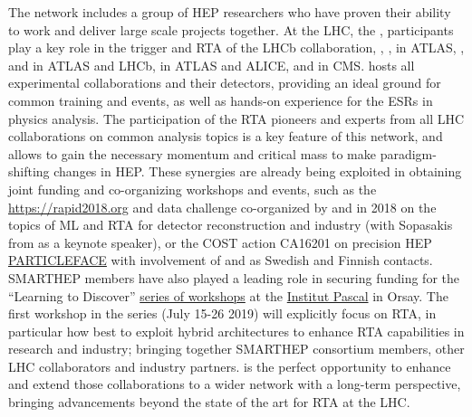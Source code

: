 The \acronym network includes a group of HEP researchers who have proven their ability to work and deliver large scale projects together. 
At the LHC, the \dortmundentity, \santiagoentity participants play a key role in the trigger and RTA of the LHCb collaboration, \ohioentity, \pisaentity, \oregonentity in ATLAS, \cnrsentity, \nikhef and \heidelbergentity in ATLAS and LHCb, \lundentity in ATLAS and ALICE, \helsinkientity and \cernentity in CMS.
\cernentity hosts all experimental collaborations and their detectors, providing an ideal ground for common training and events, as well as hands-on experience for the ESRs in physics analysis. 
The participation of the RTA pioneers and experts from all LHC collaborations on common analysis topics is a key feature of this network, and allows to gain the necessary momentum and critical mass to make paradigm-shifting changes in HEP. 
These synergies are already being exploited in obtaining joint funding and co-organizing workshops and events, such as the \href{RAPID workshop}{https://rapid2018.org} and data challenge co-organized by \dortmundentity and \cnrsentity in 2018 on the topics of ML and RTA for detector reconstruction and industry (with Sopasakis from \ximantisentity as a keynote speaker), or the COST action CA16201 on precision HEP \href{https://particleface.eu}{PARTICLEFACE} with involvement of \lundentity and \helsinkientity as Swedish and Finnish contacts. SMARTHEP members have also played a leading role in securing funding for the ``Learning to Discover'' \href{https://www.universite-paris-saclay.fr/fr/learning-to-discover}{series of workshops} at the \href{https://www.universite-paris-saclay.fr/en/institut-pascal}{Institut Pascal} in Orsay. The first workshop in the series (July 15-26 2019) will explicitly focus on RTA, in particular how best to exploit hybrid architectures to enhance RTA capabilities in research and industry; bringing together SMARTHEP consortium members, other LHC collaborators and industry partners.
\acronym is the perfect opportunity to enhance and extend those collaborations to a wider network with a long-term perspective, bringing advancements beyond the state of the art for RTA at the LHC. 

